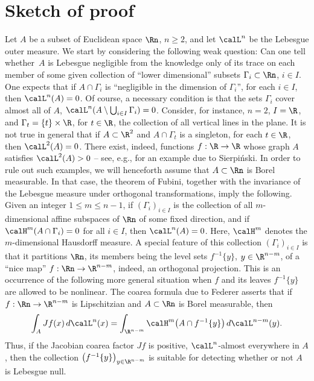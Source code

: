 \section{Sketch of proof}
Let $A$ be a subset of Euclidean space $\Rn$, $n \geq 2$, and let $\calL^n$ be the Lebesgue outer measure.
We start by considering the following weak question: Can one tell whether~$A$ is Lebesgue negligible from the knowledge only of its trace on each member of some given collection of ``lower dimensional'' subsets $\Gamma_i \subset \Rn$, $i \in I$.
One expects that if \hbox{$A \cap \Gamma_i$} is ``negligible in the dimension of $\Gamma_i$'', for each $i \in I$, then \hbox{$\calL^n(A)=0$}.
Of course, a necessary condition is that the sets $\Gamma_i$ cover almost all of $A$, \ie \hbox{$\calL^n(A \setminus \bigcup_{i \in I} \Gamma_i)=0$}.
Consider, for instance, $n=2$, $I = \R$, and $\Gamma_t = \{t\} \times \R$, for $t \in \R$, the collection of all vertical lines in the plane.
It is not true in general that if $A \subset \R^2$ and $A \cap \Gamma_t$ is a singleton, for each $t \in \R$, then $\calL^2(A)=0$.
There exist, indeed, functions $f: \R \to \R$ whose graph $A$ satisfies $\calL^2(A) > 0$ -- see, e.g., \cite[Chap.\,2, Th.\,4]{KHARAZISHVILI} for an example due to Sierpi\'nski.
In order to rule out such exam\-ples, we will henceforth assume that $A \subset \Rn$ is Borel measurable.
In that case, the theorem of Fubini, together with the invariance of the Lebesgue measure under orthogonal transformations, imply the following.
Given an integer $1 \leq m \leq n-1$, if $(\Gamma_i)_{i \in I}$ is the collection of all $m$-dimensional affine subspaces of $\Rn$ of some fixed direction, and if $\calH^m(A \cap \Gamma_i)=0$ for all $i \in I$, then $\calL^n(A)=0$.
Here, $\calH^m$ denotes the $m$-dimensional Hausdorff measure.
A special feature of this collection $(\Gamma_i)_{i \in I}$ is that it partitions $\Rn$, its members being the level sets $f^{-1}\{y\}$, $y \in \R^{n-m}$, of a ``nice map'' $f: \Rn \to \R^{n-m}$, indeed, an orthogonal projection.
This is an occurrence of the following more general situation when $f$ and its leaves $f^{-1}\{y\}$ are allowed to be nonlinear.
The coarea formula due to Federer \cite{FED.59} asserts that if $f: \Rn \to \R^{n-m}$ is Lipschitzian and $A \subset \Rn$ is Borel measurable, then
\begin{equation*}
\int_A Jf(x) \,d\calL^n(x) = \int_{\R^{n-m}} \calH^m\bigl(A \cap f^{-1}\{y \}\bigr) \,d\calL^{n-m}(y).
\end{equation*}
Thus, if the Jacobian coarea factor $Jf$ is positive, $\calL^n$-almost everywhere in $A$, then the collection $\left(f^{-1}\{y\} \right)_{y \in \R^{n-m}}$ is suitable for detecting whether or not $A$ is Lebesgue null.
